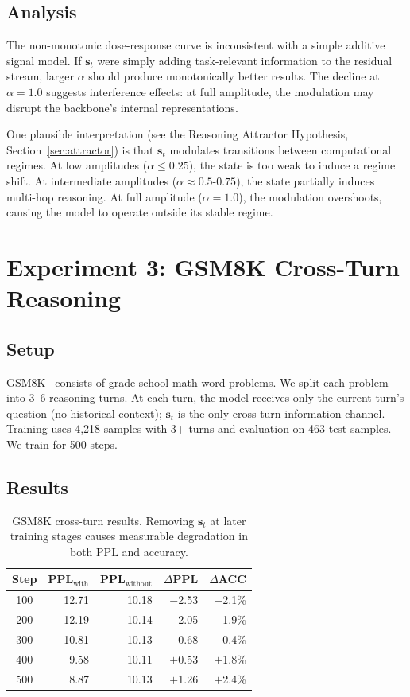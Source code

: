 \documentclass[11pt,a4paper]{article}
\begin{document}
\subsection{Analysis}

The non-monotonic dose-response curve is inconsistent with a simple additive signal model. If $\mathbf{s}_t$ were simply adding task-relevant information to the residual stream, larger $\alpha$ should produce monotonically better results. The decline at $\alpha = 1.0$ suggests interference effects: at full amplitude, the modulation may disrupt the backbone's internal representations.

One plausible interpretation (see the Reasoning Attractor Hypothesis, Section~\ref{sec:attractor}) is that $\mathbf{s}_t$ modulates transitions between computational regimes. At low amplitudes ($\alpha \leq 0.25$), the state is too weak to induce a regime shift. At intermediate amplitudes ($\alpha \approx 0.5$-$0.75$), the state partially induces multi-hop reasoning. At full amplitude ($\alpha = 1.0$), the modulation overshoots, causing the model to operate outside its stable regime.

\section{Experiment 3: GSM8K Cross-Turn Reasoning}
\label{sec:gsm8k}

\subsection{Setup}

GSM8K~\cite{cobbe2021training} consists of grade-school math word problems. We split each problem into 3--6 reasoning turns. At each turn, the model receives only the current turn's question (no historical context); $\mathbf{s}_t$ is the only cross-turn information channel. Training uses 4,218 samples with 3+ turns and evaluation on 463 test samples. We train for 500 steps.

\subsection{Results}

\begin{table}[t]
\centering
\caption{GSM8K cross-turn results. Removing $\mathbf{s}_t$ at later training stages causes measurable degradation in both PPL and accuracy.}
\label{tab:gsm8k}
\begin{tabular}{@{}crrrr@{}}
\toprule
Step & PPL$_{\text{with}}$ & PPL$_{\text{without}}$ & $\Delta$PPL & $\Delta$ACC \\
\midrule
100 & 12.71 & 10.18 & $-$2.53 & $-$2.1\% \\
200 & 12.19 & 10.14 & $-$2.05 & $-$1.9\% \\
300 & 10.81 & 10.13 & $-$0.68 & $-$0.4\% \\
400 & 9.58 & 10.11 & $+$0.53 & $+$1.8\% \\
500 & 8.87 & 10.13 & $+$1.26 & $+$2.4\% \\
\bottomrule
\end{tabular}
\end{table}
\end{document}
